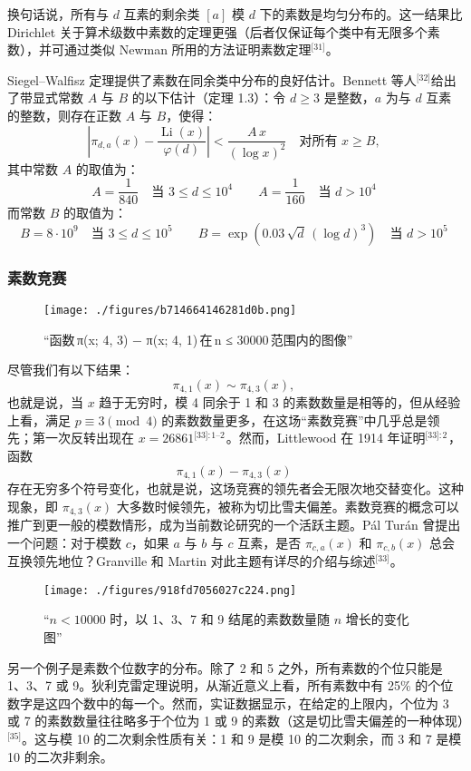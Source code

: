 换句话说，所有与 $d$ 互素的剩余类 $[a]$ 模 $d$ 下的素数是均匀分布的。这一结果比 Dirichlet 关于算术级数中素数的定理更强（后者仅保证每个类中有无限多个素数），并可通过类似 Newman 所用的方法证明素数定理\(^\text{[31]}\)。

Siegel–Walfisz 定理提供了素数在同余类中分布的良好估计。Bennett 等人\(^\text{[32]}\)给出了带显式常数 $A$ 与 $B$ 的以下估计（定理 1.3）：令 $d \geq 3$ 是整数，$a$ 为与 $d$ 互素的整数，则存在正数 $A$ 与 $B$，使得：
$$
\left|\pi_{d,a}(x) - \frac{\operatorname{Li}(x)}{\varphi(d)}\right| < \frac{A\, x}{(\log x)^2} \quad \text{对所有 } x \geq B,~
$$
其中常数 $A$ 的取值为：
$$
A = \frac{1}{840} \quad \text{当 } 3 \leq d \leq 10^4 \qquad A = \frac{1}{160} \quad \text{当 } d > 10^4~
$$
而常数 $B$ 的取值为：
$$
B = 8 \cdot 10^9 \quad \text{当 } 3 \leq d \leq 10^5 \qquad B = \exp\left( 0.03\, \sqrt{d}\, (\log d)^3 \right) \quad \text{当 } d > 10^5~
$$
\subsubsection{素数竞赛}
\begin{figure}[ht]
\centering
\texttt{[image: ./figures/b714664146281d0b.png]}
\caption{“函数 π(x; 4, 3) − π(x; 4, 1) 在 n ≤ 30000 范围内的图像”} \label{fig_SDL_3}
\end{figure}
尽管我们有以下结果：
$$
\pi_{4,1}(x) \sim \pi_{4,3}(x),~
$$
也就是说，当 $x$ 趋于无穷时，模 4 同余于 1 和 3 的素数数量是相等的，但从经验上看，满足 $p \equiv 3 \pmod{4}$ 的素数数量更多，在这场“素数竞赛”中几乎总是领先；第一次反转出现在 $x = 26861$\(^\text{[33]: 1–2}\) 。然而，Littlewood 在 1914 年证明\(^\text{[33]: 2}\) ，函数
$$
\pi_{4,1}(x) - \pi_{4,3}(x)~
$$
存在无穷多个符号变化，也就是说，这场竞赛的领先者会无限次地交替变化。这种现象，即 $\pi_{4,3}(x)$ 大多数时候领先，被称为切比雪夫偏差。素数竞赛的概念可以推广到更一般的模数情形，成为当前数论研究的一个活跃主题。Pál Turán 曾提出一个问题：对于模数 $c$，如果 $a$ 与 $b$ 与 $c$ 互素，是否 $\pi_{c,a}(x)$ 和 $\pi_{c,b}(x)$ 总会互换领先地位？Granville 和 Martin 对此主题有详尽的介绍与综述\(^\text{[33]}\)。
\begin{figure}[ht]
\centering
\texttt{[image: ./figures/918fd7056027c224.png]}
\caption{“$n < 10000$ 时，以 1、3、7 和 9 结尾的素数数量随 $n$ 增长的变化图”} \label{fig_SDL_4}
\end{figure}
另一个例子是素数个位数字的分布。除了 2 和 5 之外，所有素数的个位只能是 1、3、7 或 9。狄利克雷定理说明，从渐近意义上看，所有素数中有 25\% 的个位数字是这四个数中的每一个。然而，实证数据显示，在给定的上限内，个位为 3 或 7 的素数数量往往略多于个位为 1 或 9 的素数（这是切比雪夫偏差的一种体现）\(^\text{[35]}\)。这与模 10 的二次剩余性质有关：1 和 9 是模 10 的二次剩余，而 3 和 7 是模 10 的二次非剩余。
